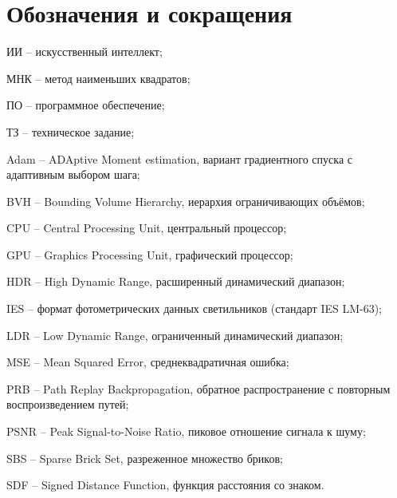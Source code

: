 \chapter*{Обозначения и сокращения}

ИИ -- искусственный интеллект;

МНК -- метод наименьших квадратов;

ПО -- программное обеспечение;

ТЗ -- техническое задание;

Adam -- ADAptive Moment estimation, вариант градиентного спуска с адаптивным выбором шага;

BVH -- Bounding Volume Hierarchy, иерархия ограничивающих объёмов;

CPU -- Central Processing Unit, центральный процессор;

GPU -- Graphics Processing Unit, графический процессор;

HDR -- High Dynamic Range, расширенный динамический диапазон;

IES -- формат фотометрических данных светильников (стандарт IES LM-63);

LDR -- Low Dynamic Range, ограниченный динамический диапазон;

MSE -- Mean Squared Error, среднеквадратичная ошибка;

PRB -- Path Replay Backpropagation, обратное распространение с повторным воспроизведением путей;

PSNR -- Peak Signal-to-Noise Ratio, пиковое отношение сигнала к шуму;

SBS -- Sparse Brick Set, разреженное множество бриков;

SDF -- Signed Distance Function, функция расстояния со знаком.

\endinput
